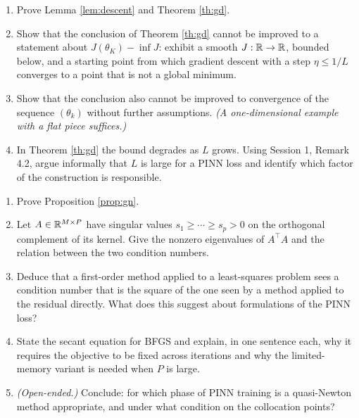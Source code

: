 \documentclass[11pt,a4paper]{article}
\begin{document}
\begin{exercise}\label{ex:gd}
\leavevmode
\begin{enumerate}[label=\textbf{\arabic*.}]
\item Prove Lemma \ref{lem:descent} and Theorem \ref{th:gd}.
\item Show that the conclusion of Theorem \ref{th:gd} cannot be improved to a statement about
$J(\theta_K) - \inf J$: exhibit a smooth $J : \mathbb{R} \to \mathbb{R}$, bounded below, and a starting point from
which gradient descent with a step $\eta \le 1/L$ converges to a point that is not a global minimum.
\item Show that the conclusion also cannot be improved to convergence of the sequence $(\theta_k)$
without further assumptions. \emph{(A one-dimensional example with a flat piece suffices.)}
\item In Theorem \ref{th:gd} the bound degrades as $L$ grows. Using Session 1,
Remark 4.2, argue informally that $L$ is large for a PINN loss and identify which factor of the
construction is responsible.
\end{enumerate}
\end{exercise}

\begin{exercise}\label{ex:gn}
\leavevmode
\begin{enumerate}[label=\textbf{\arabic*.}]
\item Prove Proposition \ref{prop:gn}.
\item Let $A \in \mathbb{R}^{M\times P}$ have singular values $s_1 \ge \cdots \ge s_p > 0$ on the orthogonal
complement of its kernel. Give the nonzero eigenvalues of $A^{\!\top}A$ and the relation between the
two condition numbers.
\item Deduce that a first-order method applied to a least-squares problem sees a condition number
that is the square of the one seen by a method applied to the residual directly. What does this
suggest about formulations of the PINN loss?
\item State the secant equation for BFGS and explain, in one sentence each, why it requires the
objective to be fixed across iterations and why the limited-memory variant is needed when $P$ is
large.
\item \emph{(Open-ended.)} Conclude: for which phase of PINN training is a quasi-Newton method
appropriate, and under what condition on the collocation points?
\end{enumerate}
\end{exercise}
\end{document}

